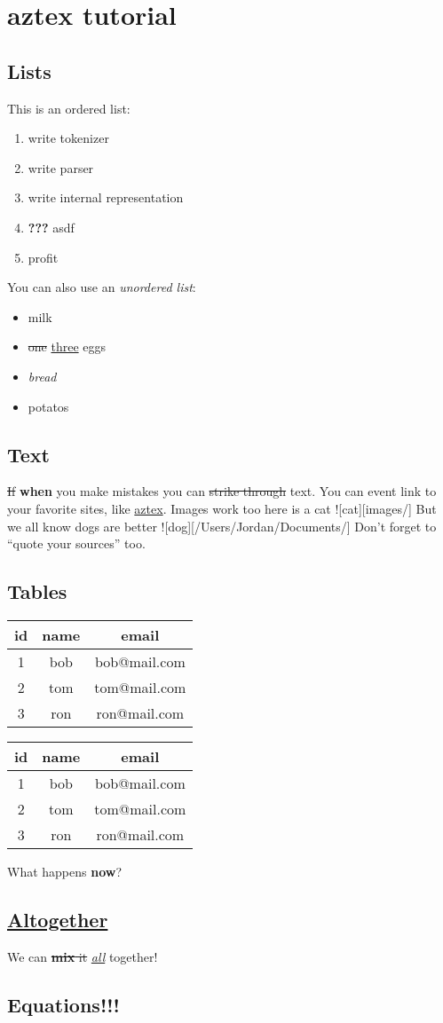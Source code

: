 \documentclass{article}
\begin{document}
\section{aztex tutorial}
\subsection{Lists}
This is an ordered list:
\begin{enumerate}
\item write tokenizer
\item write parser
\item write internal representation
\item \textbf{???} asdf
\item profit
\end{enumerate}
You can also use an \textit{unordered list}:
\begin{itemize}
\item milk
\item \sout{one} \underline{three} eggs
\item \textit{bread}
\item potatos
\end{itemize}
\subsection{Text}
\sout{If} \textbf{when} you make mistakes you can \sout{strike through} text.
You can event link to your favorite sites, like \href{http://github.com/thuc289/azTex}{aztex}.
Images work too here is a cat ![cat][images/]
But we all know dogs are better ![dog][/Users/Jordan/Documents/]
Don't forget to ``quote your sources'' too.
\subsection{Tables}
\noindent
\begin{tabular}{| c | c | c |}
\hline 
id&name&email\\
\hline 
1&bob&bob@mail.com\\
\hline 
2&tom&tom@mail.com\\
\hline 
3&ron&ron@mail.com\\
\hline 
\end{tabular}

\noindent
\begin{tabular}{| c | c | c |}
\hline 
id&name&email\\
\hline 
1&bob&bob@mail.com\\
\hline 
2&tom&tom@mail.com\\
\hline 
3&ron&ron@mail.com\\
\hline 
\end{tabular}

What happens \textbf{now}?
\subsection{\underline{Altogether}}
We can \sout{\textbf{mix} it}  \underline{\textit{all}} together!
\subsection{Equations!!!}
\end{document}
